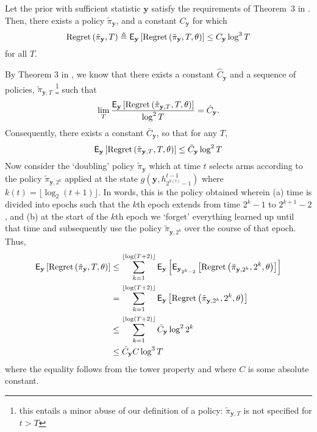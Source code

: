 {\begin{lemma} 
\label{lemma:laianytime}
Let the prior with sufficient statistic $\mathbf y$ satisfy the requirements of Theorem~$3$ in \cite{lai1987adaptive}. Then, there exists a policy $\tilde \pi_{\mathbf y}$, and a constant $C_{\mathbf y}$ for which
\[
{\rm Regret}\left(
\tilde \pi_{\mathbf y}, T
\right)
\triangleq 
\mathsf{E}_{\mathbf y}
\left[
{\rm Regret}\left(
\tilde \pi_{\mathbf y}, T,\theta
\right)
\right]
\leq
C_{\mathbf y} \log^3 T
\] 
for all $T$. 
\end{lemma}
\begin{myproof}[Proof.]
By Theorem $3$ in \cite{lai1987adaptive}, we know that there exists a constant $\hat C_{\mathbf y}$ and a sequence of policies, $\tilde \pi_{\mathbf y, T}$ \footnote{this entails a minor abuse of our definition of a policy: $\tilde \pi_{\mathbf y, T}$ is not specified for $t > T$}  such that 
\[
\lim_T 
\frac{
\mathsf{E}
_{\mathbf y}
\left[
{\rm Regret}\left(
\tilde \pi_{\mathbf y, T}, T,\theta
\right)
\right]
}
{
\log^2 T
}
=
\hat C_{\mathbf y}.
\]
Consequently, there exists a constant $\bar C_{\mathbf y}$, so that for any $T$, 
\[
\mathsf{E}
_{\mathbf y}
\left[
{\rm Regret}\left(
\tilde \pi_{\mathbf y, T}, T,\theta
\right)
\right]
\leq
\bar C_{\mathbf y} \log^2 T
\]
Now consider the `doubling' policy $\tilde \pi_{\mathbf y}$ which at time $t$ selects arms according to the policy $\tilde \pi_{\mathbf y,2^k}$ applied at the state $g\left(\mathbf y, h_{2^{k(t)}-1}^{t-1}\right)$ where $k(t) = \lfloor \log_2(t+1) \rfloor$. In words, this is the policy obtained wherein (a) time is divided into epochs such that the $k$th epoch extends from time $2^{k}-1$ to $2^{k+1}-2$, and (b) at the start of the $k$th epoch we `forget' everything learned up until that time and subsequently use the policy $\tilde \pi_{\mathbf y,2^k}$ over the course of that epoch. Thus,
\[
\begin{split}
\mathsf{E}
_{\mathbf y}
\left[
{\rm Regret}\left(
\tilde \pi_{\mathbf y}, T,\theta
\right)
\right]
&
\leq
\sum_{k=1}^{\lfloor \log (T+2) \rfloor}
\mathsf{E}_{\mathbf y}
\left[
\mathsf{E}_{\mathbf y_{2^k -2}}
\left[
{\rm Regret}\left(
\tilde \pi_{\mathbf y,2^k}, 2^k,\theta
\right)
\right]
\right]
\\
&
=
\sum_{k=1}^{\lfloor \log (T+2) \rfloor}
\mathsf{E}_{\mathbf y}
\left[
{\rm Regret}\left(
\tilde \pi_{\mathbf y,2^k}, 2^k,\theta
\right)
\right]
\\
&
\leq
\sum_{k=1}^{\lfloor \log (T+2) \rfloor}
\bar C_{\mathbf y} \log^2 2^k
\\
&
\leq
\bar C_{\mathbf y} C \log^3 T
\end{split}
\]
where the equality follows from the tower property and where $C$ is some absolute constant. 
\end{myproof}

}
